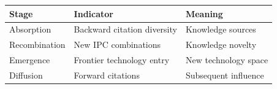 
\begin{tabular}{lll}
\toprule
Stage & Indicator & Meaning\\
\midrule
Absorption & Backward citation diversity & Knowledge sources\\
Recombination & New IPC combinations & Knowledge novelty\\
Emergence & Frontier technology entry & New technology space\\
Diffusion & Forward citations & Subsequent influence\\
\bottomrule
\end{tabular}
